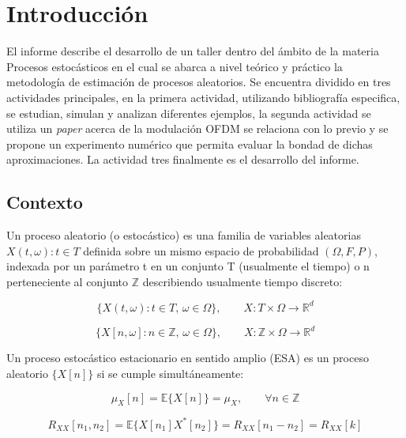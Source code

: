 \documentclass[a4paper]{article}
\begin{document}
 \section*{Introducción}
 
 El informe describe el desarrollo de un taller dentro del ámbito de la materia Procesos estocásticos en el cual se abarca a nivel teórico y práctico la metodología de estimación de procesos aleatorios. Se encuentra dividido en tres actividades principales, en la primera actividad, utilizando bibliografía especifica, se estudian, simulan y analizan diferentes ejemplos, la segunda actividad se utiliza un \textit{paper} acerca de la modulación OFDM se relaciona con lo previo y se propone un experimento numérico que permita evaluar la bondad de dichas aproximaciones. La actividad tres finalmente es el desarrollo del informe.
 
 \subsection*{Contexto}
 
 
Un proceso aleatorio (o estocástico) es una familia de variables aleatorias ${X(t, \omega) : t \in T}$ definida sobre un mismo espacio de probabilidad $(\Omega, F, P)$, indexada por un parámetro t en un conjunto T (usualmente el tiempo) o n perteneciente al conjunto $\mathbb{Z}$ describiendo usualmente tiempo discreto:


\begin{equation}
	 \{X(t, \omega) : t \in T,\, \omega \in \Omega\}, \qquad X : T \times \Omega \to \mathbb{R}^d
\end{equation}
 
 
\begin{equation}
	\{X[n, \omega] : n \in \mathbb{Z},\, \omega \in \Omega\}, \qquad X : \mathbb{Z} \times \Omega \to \mathbb{R}^d
\end{equation}


Un proceso estocástico estacionario en sentido amplio (ESA) es un proceso aleatorio $\{X[n]\}$ si se cumple simultáneamente:

\begin{equation}
	\mu_X[n] = \mathbb{E}\{X[n]\} = \mu_X, \qquad \forall n \in \mathbb{Z}
\end{equation}

\begin{equation}
	R_{XX}[n_1, n_2] = \mathbb{E}\{X[n_1]X^*[n_2]\} = R_{XX}[n_1 - n_2] = R_{XX}[k]
\end{equation}
\end{document}
